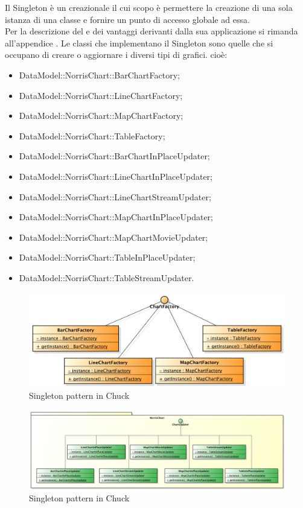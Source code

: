			Il Singleton è un  creazionale il cui scopo è permettere la creazione di una sola istanza di una classe e fornire un punto di accesso globale ad essa.\\
			Per la descrizione del  e dei vantaggi derivanti dalla sua applicazione si rimanda all'appendice .
				Le classi che implementano il Singleton sono quelle che si occupano di creare o aggiornare i diversi tipi di grafici. cioè:
				\begin{itemize}
					\item DataModel::NorrisChart::BarChartFactory;
					\item DataModel::NorrisChart::LineChartFactory;
					\item DataModel::NorrisChart::MapChartFactory;
					\item DataModel::NorrisChart::TableFactory;
					\item DataModel::NorrisChart::BarChartInPlaceUpdater;
					\item DataModel::NorrisChart::LineChartInPlaceUpdater;
					\item DataModel::NorrisChart::LineChartStreamUpdater;
					\item DataModel::NorrisChart::MapChartInPlaceUpdater;
					\item DataModel::NorrisChart::MapChartMovieUpdater;
					\item DataModel::NorrisChart::TableInPlaceUpdater;
					\item DataModel::NorrisChart::TableStreamUpdater.
			\end{itemize}
			\begin{figure}[H]\centering
	        		\includegraphics[width=\textwidth]{SpecificaTecnica/Pics/DesignPatternNorris/Singleton2}
	        		\caption{Singleton pattern in Chuck}
	    		\end{figure}
	    		\begin{figure}[H]\centering
	        		\includegraphics[width=\textwidth]{SpecificaTecnica/Pics/DesignPatternNorris/Singleton1}
	        		\caption{Singleton pattern in Chuck}
	    		\end{figure}
						

